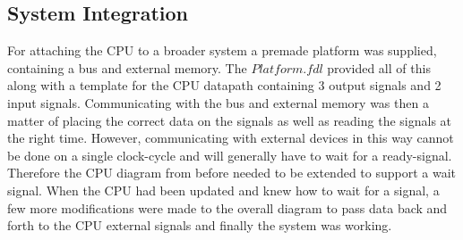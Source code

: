 \documentclass[12pt,a4paper]{article}
\begin{document}
\subsection{System Integration}
	For attaching the CPU to a broader system a premade platform was supplied, containing a bus and external memory. The $Platform.fdl$ provided all of this along with a template for the CPU datapath containing 3 output signals and 2 input signals. Communicating with the bus and external memory was then a matter of placing the correct data on the signals as well as reading the signals at the right time. However, communicating with external devices in this way cannot be done on a single clock-cycle and will generally have to wait for a ready-signal. Therefore the CPU diagram from before needed to be extended to support a wait signal. When the CPU had been updated and knew how to wait for a signal, a few more modifications were made to the overall diagram to pass data back and forth to the CPU external signals and finally the system was working.
	
\end{document}
